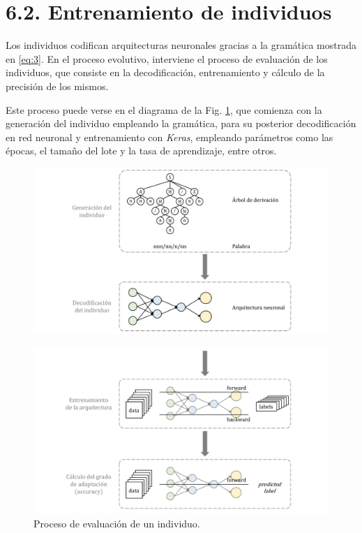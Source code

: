 \documentclass[spanish,a4paper,12pt,twoside]{report}
\begin{document}
 \section*{\Large 6.2. Entrenamiento de individuos}
  Los individuos codifican arquitecturas neuronales gracias a la gramática mostrada en \ref{eq:3}. En el proceso evolutivo, interviene el proceso de evaluación de los individuos, que consiste en la decodificación, entrenamiento y cálculo de la precisión de los mismos. \par
  Este proceso puede verse en el diagrama de la Fig. \ref{fig:16}, que comienza con la generación del individuo empleando la gramática, para su posterior decodificación en red neuronal y entrenamiento con \emph{Keras}, empleando parámetros como las épocas, el tamaño del lote y la tasa de aprendizaje, entre otros. \vfill
  \begin{figure}[H]
    \centering
    \includegraphics[width = 1\textwidth]{resources/Fig16_1.pdf}
  \end{figure} \par
  \vspace{-1cm}
  \begin{figure}[H]
    \centering
    \includegraphics[width = 1\textwidth]{resources/Fig16_2.pdf}
    \caption{Proceso de evaluación de un individuo.}
    \label{fig:16}
  \end{figure} \par
\end{document}
